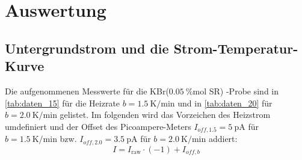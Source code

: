 \section{Auswertung}
\label{sec:Auswertung}

\subsection{Untergrundstrom und die Strom-Temperatur-Kurve}
Die aufgenommenen Messwerte für die KBr($\SI{0.05}{\percent \mole}$ SR) -Probe sind in \autoref{tab:daten_15} für die Heizrate $b = \SI{1.5}{\kelvin \per \minute}$ und in \autoref{tab:daten_20} für $b = \SI{2.0}{\kelvin \per \minute}$ gelistet.
Im folgenden wird das Vorzeichen des Heizstrom umdefiniert und der Offset des Picoampere-Meters $I_{off, 1.5} = \SI{5}{\pico\ampere}$ für $b = \SI{1.5}{\kelvin \per \minute}$ bzw. $I_{off, 2.0} = \SI{3.5}{\pico\ampere}$ für $b = \SI{2.0}{\kelvin \per \minute}$ addiert:
\begin{equation*}
    I = I_\text{raw} \cdot (-1) + I_{off, b}
\end{equation*}
